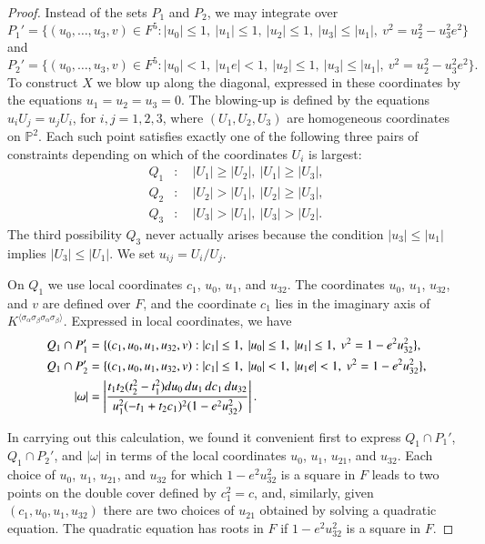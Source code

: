 \documentclass{amsart}
\newcommand\bP{{\mathbb P}}
\begin{document}
\begin{proof}
Instead of the sets $P_1$ and $P_2$, we may integrate over 
$$P_1' = \{(u_0,\ldots,u_3,v)\in F^5: |u_0|\le 1,\ |u_1|\le 1,\ |u_2|\le 1,\ 
  |u_3|\le |u_1|,\ v^2=u_2^2-u_3^2 e^2\}$$
and
$$P_2' = \{(u_0,\ldots,u_3,v)\in F^5: 
     |u_0|<1,\ |u_1 e|<1,\ |u_2|\le 1,\ 
  |u_3|\le |u_1|,\ v^2=u_2^2-u_3^2e^2\}.$$
To construct $X$ we blow up along the diagonal, expressed in these
coordinates by the equations $u_1=u_2=u_3=0$.  The blowing-up is defined
by the equations $u_iU_j = u_jU_i$, for $i,j=1,2,3$, 
where $(U_1,U_2,U_3)$ are
homogeneous coordinates on $\bP^2$.  Each such point satisfies exactly
one of the following three pairs of constraints depending on
which of the coordinates $U_i$ is largest:
\begin{align*}
Q_1 &:\quad |U_1|\ge |U_2|,\ |U_1|\ge |U_3|, \\
Q_2 &:\quad |U_2| >  |U_1|,\ |U_2|\ge |U_3|, \\
Q_3 &:\quad |U_3|>   |U_1|,\ |U_3|> |U_2|.
\end{align*}
The third possibility $Q_3$ never actually arises because the
condition $|u_3|\le |u_1|$ implies $|U_3|\le |U_1|$.
We set $u_{ij} = U_i/U_j$.

On $Q_1$ we use local coordinates $c_1$, $u_0$, $u_1$, and 
$u_{32}$.  The coordinates $u_0$, $u_1$, $u_{32}$, and $v$
are
defined over $F$, and the coordinate $c_1$ lies in the
imaginary axis of $K^{\langle\sigma_\alpha\sigma_\beta
\sigma_\alpha\sigma_\beta\rangle}$.  Expressed in local
coordinates, we have
\begin{align*}
Q_1\cap P_1' &= \{(c_1,u_0,u_1,u_{32},v):
  |c_1|\le 1,\ |u_0|\le 1,\ |u_1|\le 1,\ 
  v^2=1-e^2 u_{32}^2 \}, \\
Q_1\cap P_2' &= \{(c_1,u_0,u_1,u_{32},v):
  |c_1|\le 1,\ |u_0|< 1, \ |u_1 e|<1,\ 
  v^2=1-e^2 u_{32}^2 \},\\
|\omega| &= \left|
{t_1 t_2 (t_2^2-t_1^2) du_0\,du_1\,dc_1\, du_{32} \over
 u_1^2(-t_1+t_2 c_1)^2 (1-e^2 u_{32}^2) }
\right|.
\end{align*}

In carrying out this calculation, we found it convenient
first
to express $Q_1\cap P_1'$, $Q_1\cap P_2'$, and $|\omega|$
in terms of the local coordinates $u_0$, $u_1$, $u_{21}$,
and $u_{32}$.  
 Each choice of $u_0$, $u_1$, $u_{21}$, and 
$u_{32}$ for which $1-e^2 u_{32}^2$ is a square in $F$
leads to  two
points on the double cover defined by $c_1^2=c$, and, similarly,
given $(c_1,u_0,u_1,u_{32})$ there are two choices of
$u_{21}$ obtained by solving a quadratic equation. 
The quadratic equation has roots in $F$ if
$1-e^2 u_{32}^2$ is a square in $F$.


\end{proof}
\end{document}
